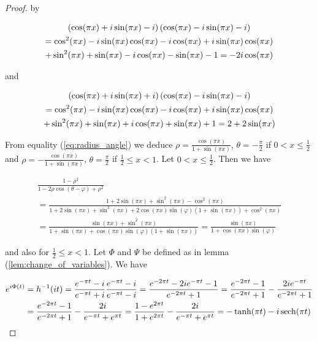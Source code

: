 \begin{proof}
\noindent by

\begin{multline*}
	\del[0]{\cos(\pi x) + i\sin(\pi x) - i}\del[0]{\cos(\pi x) - i\sin(\pi x) - i}\\ = \cos^2(\pi x) - i\sin(\pi x)\cos(\pi x)	
		-i\cos(\pi x) + i\sin(\pi x)\cos(\pi x)\\
	 	+ \sin^2(\pi x) + \sin(\pi x) - i \cos(\pi x) - \sin(\pi x) - 1 = -2i \cos(\pi x)  
\end{multline*}

\noindent and
	
\begin{multline*}
	\del[0]{ \cos(\pi x) + i\sin(\pi x) + i }\del[0]{ \cos(\pi x) - i\sin(\pi x) - i }\\ = \cos^2(\pi x) - i\sin(\pi x)\cos(\pi x) - i\cos(\pi x) + i\sin(\pi x)\cos(\pi x)\\
	+ \sin^2(\pi x) + \sin(\pi x)+ i \cos(\pi x) + \sin(\pi x) + 1 = 2 + 2\sin(\pi x)
\end{multline*}

	From equality (\ref{eq:radius_angle}) we deduce $\rho = \frac{\cos(\pi x)}{1 + \sin(\pi x)}$, $\theta = -\frac{\pi}{2}$ if $0 < x \leq \frac{1}{2}$ and $\rho = -\frac{\cos(\pi x)}{1 + \sin(\pi x)}$, $\theta = \frac{\pi}{2}$ if $\frac{1}{2} \leq x < 1$. Let $0 < x \leq \frac{1}{2}$. Then we have

\begin{multline*}
	\frac{1 - \rho^2}{1 - 2\rho\cos(\theta - \varphi) + \rho^2} \\= \frac{1 + 2\sin(\pi x) + \sin^2(\pi x) - \cos^2(\pi x)}{1 + 2\sin(\pi x) + \sin^2(\pi x) + 2\cos(\pi x)\sin(\varphi)(1 + \sin(\pi x)) + \cos^2(\pi x)}\\
	= \frac{\sin(\pi x) + \sin^2(\pi x)}{1 + \sin(\pi x) + \cos(\pi x)\sin(\varphi)(1 + \sin(\pi x))}
	= \frac{\sin(\pi x)}{1 + \cos(\pi x)\sin(\varphi)}
\end{multline*}

\noindent and also for $\frac{1}{2} \leq x < 1$. Let $\Phi$ and $\Psi$ be defined as in lemma (\ref{lem:change_of_variables}). We have 
				
\begin{gather*}
	\begin{aligned}
		e^{i\Phi(t)} &= h^{-1}(it) = \frac{e^{-\pi t} - i}{e^{-\pi t} + i} \frac{e^{-\pi t} - i}{e^{-\pi t} - i} = \frac{e^{-2\pi t} - 2ie^{-\pi t} - 1}{e^{-2\pi t} + 1} = \frac{e^{-2\pi t} - 1}{e^{-2\pi t} + 1} - \frac{2ie^{-\pi t}}{e^{-2\pi t} + 1}\\ 
		&= \frac{e^{-2\pi t} - 1}{e^{-2\pi t} + 1} - \frac{2i}{e^{-\pi t} + e^{\pi t}} = \frac{1 - e^{2\pi t}}{1 + e^{2\pi t}} - \frac{2i}{e^{-\pi t} + e^{\pi t}} = -\tanh (\pi t) - i \operatorname{sech}(\pi t)
	\end{aligned}
\end{gather*}
	

\end{proof}
